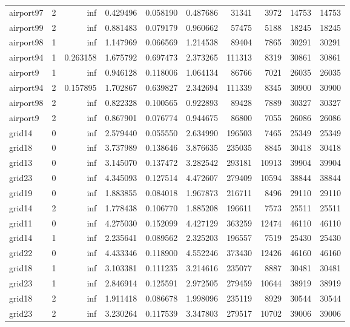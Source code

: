 \begin{longtable}{|l|r|r|r|r|r|r|r|r|r|}
airport97 & 2 & inf & 0.429496 & 0.058190 & 0.487686 & 31341 & 3972 & 14753 & 14753 \\
airport99 & 2 & inf & 0.881483 & 0.079179 & 0.960662 & 57475 & 5188 & 18245 & 18245 \\
airport98 & 1 & inf & 1.147969 & 0.066569 & 1.214538 & 89404 & 7865 & 30291 & 30291 \\
airport94 & 1 & 0.263158 & 1.675792 & 0.697473 & 2.373265 & 111313 & 8319 & 30861 & 30861 \\
airport9 & 1 & inf & 0.946128 & 0.118006 & 1.064134 & 86766 & 7021 & 26035 & 26035 \\
airport94 & 2 & 0.157895 & 1.702867 & 0.639827 & 2.342694 & 111339 & 8345 & 30900 & 30900 \\
airport98 & 2 & inf & 0.822328 & 0.100565 & 0.922893 & 89428 & 7889 & 30327 & 30327 \\
airport9 & 2 & inf & 0.867901 & 0.076774 & 0.944675 & 86800 & 7055 & 26086 & 26086 \\
grid14 & 0 & inf & 2.579440 & 0.055550 & 2.634990 & 196503 & 7465 & 25349 & 25349 \\
grid18 & 0 & inf & 3.737989 & 0.138646 & 3.876635 & 235035 & 8845 & 30418 & 30418 \\
grid13 & 0 & inf & 3.145070 & 0.137472 & 3.282542 & 293181 & 10913 & 39904 & 39904 \\
grid23 & 0 & inf & 4.345093 & 0.127514 & 4.472607 & 279409 & 10594 & 38844 & 38844 \\
grid19 & 0 & inf & 1.883855 & 0.084018 & 1.967873 & 216711 & 8496 & 29110 & 29110 \\
grid14 & 2 & inf & 1.778438 & 0.106770 & 1.885208 & 196611 & 7573 & 25511 & 25511 \\
grid11 & 0 & inf & 4.275030 & 0.152099 & 4.427129 & 363259 & 12474 & 46110 & 46110 \\
grid14 & 1 & inf & 2.235641 & 0.089562 & 2.325203 & 196557 & 7519 & 25430 & 25430 \\
grid22 & 0 & inf & 4.433346 & 0.118900 & 4.552246 & 373430 & 12426 & 46160 & 46160 \\
grid18 & 1 & inf & 3.103381 & 0.111235 & 3.214616 & 235077 & 8887 & 30481 & 30481 \\
grid23 & 1 & inf & 2.846914 & 0.125591 & 2.972505 & 279459 & 10644 & 38919 & 38919 \\
grid18 & 2 & inf & 1.911418 & 0.086678 & 1.998096 & 235119 & 8929 & 30544 & 30544 \\
grid23 & 2 & inf & 3.230264 & 0.117539 & 3.347803 & 279517 & 10702 & 39006 & 39006 \\

\end{longtable}
